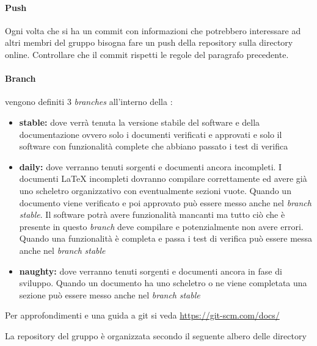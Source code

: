 \documentclass[12pt,a4paper]{article}
\begin{document}
\paragraph{Push}
Ogni volta che si ha un commit con informazioni che potrebbero interessare ad altri membri del gruppo bisogna fare un push della repository sulla directory online. Controllare che il commit rispetti le regole del paragrafo precedente.
\\


\paragraph{Branch} vengono definiti 3 \textit{branches} all'interno della \textit{}:
\begin{itemize}
	\item \textbf{stable:} dove verrà tenuta la versione stabile del software e della documentazione ovvero solo i documenti verificati e  approvati e solo il software con funzionalità complete che abbiano passato i test di verifica
	\item \textbf{daily:} dove verranno tenuti sorgenti e documenti ancora incompleti. I documenti \LaTeX{} incompleti dovranno compilare correttamente ed avere già uno scheletro organizzativo con eventualmente sezioni vuote. Quando un documento viene verificato e poi approvato può essere messo anche nel \textit{branch} \textit{stable}. Il software potrà avere funzionalità mancanti ma tutto ciò che è presente in questo \textit{branch} deve compilare e potenzialmente non avere errori. Quando una funzionalità è completa e passa i test di verifica può essere messa anche nel \textit{branch} \textit{stable}
	\item \textbf{naughty:} dove verranno tenuti sorgenti e documenti ancora in fase di sviluppo. Quando un documento ha uno scheletro o ne viene completata una sezione può essere messo anche nel \textit{branch} \textit{stable}
\end{itemize}

Per approfondimenti e una guida a git si veda \url{https://git-scm.com/docs/}

La repository del gruppo è organizzata secondo il seguente albero delle directory
\\

 
\end{document}
